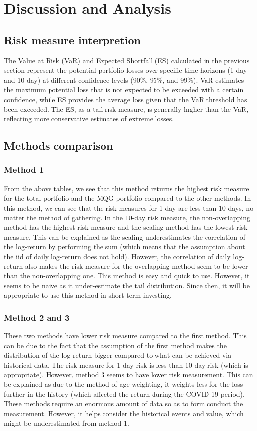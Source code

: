 \section{Discussion and Analysis}
\subsection{Risk measure interpretion}
The Value at Risk (VaR) and Expected Shortfall (ES) calculated in the previous section represent the potential portfolio losses over specific time horizons (1-day and 10-day) at different confidence levels (90\%, 95\%, and 99\%). VaR estimates the maximum potential loss that is not expected to be exceeded with a certain confidence, while ES provides the average loss given that the VaR threshold has been exceeded. The ES, as a tail risk measure, is generally higher than the VaR, reflecting more conservative estimates of extreme losses.
\subsection{Methods comparison}
\subsubsection{Method 1}
From the above tables, we see that this method returns the highest risk measure for the total portfolio and the MQG portfolio compared to the other methods. In this method, we can see that the risk measures for 1 day are less than 10 days, no matter the method of gathering. In the 10-day risk measure, the non-overlapping method has the highest risk measure and the scaling method has the lowest risk measure. This can be explained as the scaling underestimates the correlation of the log-return by performing the sum (which means that the assumption about the iid of daily log-return does not hold). However, the correlation of daily log-return also makes the risk measure for the overlapping method seem to be lower than the non-overlapping one. This method is easy and quick to use. However, it seems to be naive as it under-estimate the tail distribution. Since then, it will be appropriate to use this method in short-term investing.
\subsubsection{Method 2 and 3}
These two methods have lower risk measure compared to the first method. This can be due to the fact that the assumption of the first method makes the distribution of the log-return bigger compared to what can be achieved via historical data. The risk measure for 1-day risk is less than 10-day risk (which is appropriate). However, method 3 seems to have lower risk measurement. This can be explained as due to the method of age-weighting, it weights less for the loss further in the history (which affected the return during the COVID-19 period). These methods require an enormous amount of data so as to form conduct the measurement. However, it helps consider the historical events and value, which might be underestimated from method 1.
